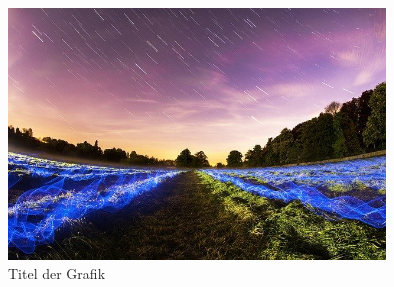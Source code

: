 \documentclass{article}
\begin{document}
  \begin{figure}
    \caption{Titel der Grafik}
    \includegraphics[width=10cm]{sample.jpg}
  \end{figure}
\end{document}
